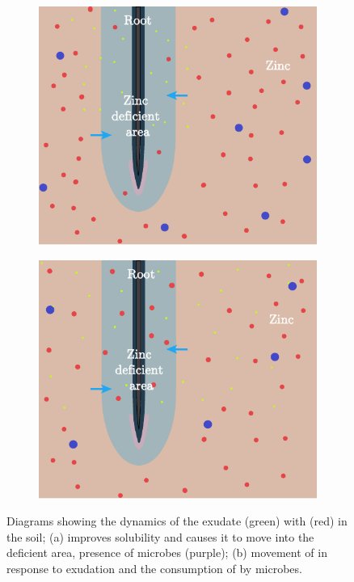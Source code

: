 \documentclass[11pt]{article}
\numberwithin{equation}{section}
\begin{document}
\begin{figure}[h]
\centering
\begin{subfigure}[t]{0.35\textwidth}
    \includegraphics[width=\textwidth]{Figures/RootZincDiagram.pdf}
    \caption{}
    \label{fig:Zinc}
\end{subfigure}
\qquad
\begin{subfigure}[t]{0.35\textwidth}
    \includegraphics[width=\textwidth]{Figures/RootZincDiagram2.pdf}
    \caption{}
    \label{fig:my_label}
\end{subfigure}
\caption{Diagrams showing the dynamics of the exudate  (green) with  (red) in the soil; (a)  improves  solubility and causes it to move into the deficient area, presence of microbes (purple); (b) movement of  in response to  exudation and the consumption of  by microbes.}
\end{figure}
\end{document}
